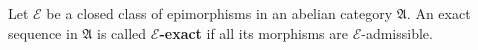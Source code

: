 Let $\mathcal{E}$ be a closed class of epimorphisms in an abelian category $\mathfrak{A}$. An exact sequence in $\mathfrak{A}$ is called \textbf{$\mathcal{E}$-exact} if all its morphisms are $\mathcal{E}$-admissible.
